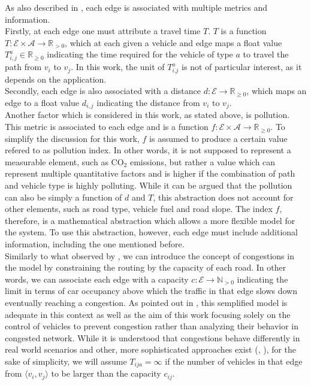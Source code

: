 As also described in \cite{project_thesis}, each edge is associated with multiple metrics and information. \\
Firstly, at each edge one must attribute a travel time $T$. $T$ is a function $T: \mathcal{E} \times \mathcal{A} \rightarrow \mathbb{R}_{> 0}$, which at each given a vehicle and edge maps a float value $T_{i,j}^a \in \mathbb{R}_{\geq 0}$ indicating the time required for the  vehicle of type $a$ to travel the path from $v_i$ to $v_j$. In this work, the unit of  $T_{i.j}^a$ is not of particular interest, as it depends on the application. \\
Secondly, each edge is also associated with a distance $d: \mathcal{E} \rightarrow \mathbb{R}_{\geq 0}$, which maps an edge to a float value $d_{i,j}$ indicating the distance from $v_i$ to $v_j$. \\
Another factor which is considered in this work, as stated above, is pollution. This metric is associated to each edge and is a function 
$f: \mathcal{E} \times \mathcal{A} \rightarrow \mathbb{R}_{\geq 0}$. To simplify the discussion for this work, $f$ is assumed to produce a certain value refered to as pollution index. In other words, it is not supposed to represent a measurable element, such as $\text{CO}_2$ emissions, but rather a value which can represent multiple quantitative factors and is higher if the combination of path and vehicle type is highly polluting. While it can be argued that the pollution can also be simply a function of $d$ and $T$, this abstraction does not account for other elements, such as road type, vehicle fuel and road slope. The index $f$, therefore, is a mathematical abstraction which allows a more flexible model for the system. To use this abstraction, however, each edge must include additional information, including the one mentioned before. \\
Similarly to what observed by , we can introduce the concept of congestions in the model by constraining the routing by the capacity of each road. In other words, we can associate each edge with a capacity $c: \mathcal{E} \rightarrow \mathbb{N}_{> 0}$ indicating the limit in terms of car occupancy above which the traffic in that edge slows down eventually reaching a congestion. As pointed out in \cite{congestion_vrp_phd_graph}, this semplified model is adequate in this context as well as the aim of this work focusing solely on the control of vehicles to prevent congestion rather than analyzing their behavior in congested network. While it is understood that congestions behave differently in real world scenarios and other, more sophisticated approaches exist (\cite{lindsey1999congestion}, \cite{verhoef1999time}), for the sake of simplicity, we will assume $T_{ija} = \infty $ if the number of vehicles in that edge from  $\langle v_i, v_j \rangle$ to be larger than the capacity $c_{ij}$.\\
